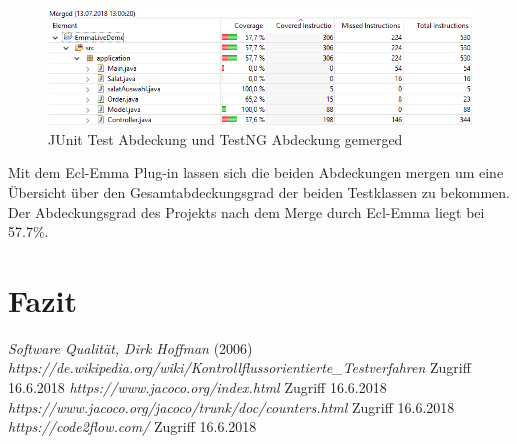 \documentclass[a4paper]{article}
\begin{document}
\begin{figure}[h]
\includegraphics[scale=0.6]{Merged_Abdeckung.png}
\caption{JUnit Test Abdeckung und TestNG Abdeckung gemerged}
\centering
\end{figure}
Mit dem Ecl-Emma Plug-in lassen sich die beiden Abdeckungen mergen um eine Übersicht über den Gesamtabdeckungsgrad der beiden Testklassen zu bekommen. Der Abdeckungsgrad des Projekts nach dem Merge durch Ecl-Emma liegt bei 57.7\%. 

\section{Fazit}
\begin{thebibliography}{1}
	 \emph{Software Qualität, Dirk Hoffman} (2006)
	 \emph{https://de.wikipedia.org/wiki/Kontrollflussorientierte\_Testverfahren} Zugriff 16.6.2018
	 \emph{https://www.jacoco.org/index.html} Zugriff 16.6.2018
	 \emph{https://www.jacoco.org/jacoco/trunk/doc/counters.html} Zugriff 16.6.2018
	 \emph{https://code2flow.com/} Zugriff 16.6.2018
\end{thebibliography}
\end{document}
